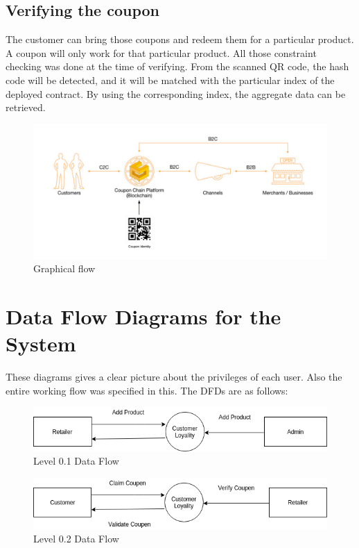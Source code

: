 \subsection{Verifying the coupon}
The customer can bring those coupons and redeem them for a particular product. A coupon will only work for that particular product. All those constraint checking was done at the time of verifying. From the scanned QR code, the hash code will be detected, and it will be matched with the particular index of the deployed contract. By using the corresponding index, the aggregate data can be retrieved.
\begin{figure}[H]
\includegraphics[scale=0.6]{flow}
\caption{Graphical flow}
\end{figure}

\section{Data Flow Diagrams for the System}
\par
These diagrams gives a clear picture about the privileges of each user. Also the entire working flow was specified in this. The DFDs are as follows:
\begin{figure}[H]
\includegraphics[scale=0.7]{level0_1}
\caption{Level 0.1 Data Flow}
\end{figure}

\begin{figure}[H]
\includegraphics[scale=0.7]{level0_2}
\caption{Level 0.2 Data Flow}
\end{figure}


